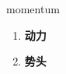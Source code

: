 
\begin{frame}
{\huge momentum}
\begin{center}
\begin{enumerate}\Large
  \item \textbf{动力}
  \item \textbf{势头}
\end{enumerate}
\end{center}
\end{frame}
